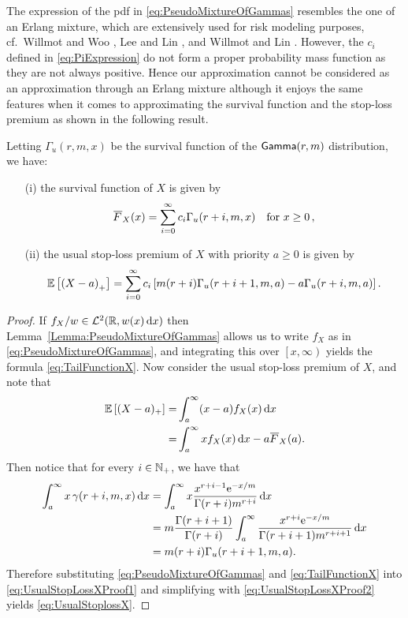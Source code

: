 The expression of the pdf in \eqref{eq:PseudoMixtureOfGammas} resembles the one of an Erlang mixture, which are extensively used for risk modeling purposes, cf.\ Willmot and Woo \cite{WiWo07}, Lee and Lin \cite{LeLi10}, and Willmot and Lin \cite{WiLi11}. However, the $c_i$ defined in \eqref{eq:PiExpression} do not form a proper probability mass function as they are not always positive. Hence our approximation cannot be considered as an approximation through an Erlang mixture although it enjoys the same features when it comes to approximating the survival function and the stop-loss premium as shown in the following result.
\begin{proposition} \label{prop:OrthogonalPolynomialForm}
Letting $\Gamma_u(r,m,x)$ be the survival function of the $\mathsf{Gamma}(r,m)$ distribution,  we have:
\begin{itemize}
\item[(i)] the survival function of $X$ is given by
\begin{equation}\label{eq:TailFunctionX}
\Ftail_{X}(x) = \sum_{i=0}^{\infty}c_i\Gamma_{u}(r+i,m,x) \quad \text{for } x \ge 0 \,,
\end{equation}
\item[(ii)] the usual stop-loss premium of $X$ with priority $a \ge 0$ is given by
\begin{equation}
\operatorname{{\mathbb E}}\left[\left(X-a\right)_{+}\right] = \sum_{i=0}^{\infty}c_i\left[m (r+i) \Gamma_{u}(r+i+1,m,a)-a\Gamma_{u}(r+i,m,a)\right]. \label{eq:UsualStoplossX}
\end{equation}
\end{itemize}
\end{proposition}
\begin{proof}
If $f_{X}/w\in \mathcal{L}^2(\mathbb{R}, w(x) \mathop{}\!\mathrm{d} x)$ then Lemma~\ref{Lemma:PseudoMixtureOfGammas} allows us to write $f_X$ as in \eqref{eq:PseudoMixtureOfGammas}, and integrating this over $\left[x,\infty\right)$ yields the formula \eqref{eq:TailFunctionX}.
Now consider the usual stop-loss premium of $X$, and note that
\begin{align}
\Exp\left[(X-a)_+\right]=&\int_{a}^{\infty}(x-a)f_{X}(x)\dd x \nonumber\\
=&\int_{a}^{\infty}xf_{X}(x)\dd x-a\Ftail_{X}(a).\label{eq:UsualStopLossXProof1}
\end{align}
Then notice that for every $i \in \mathbb{N}_+$, we have that
\begin{align}
\int_{a}^{\infty} x \, \gamma(r+i, m, x)\mathop{}\!\mathrm{d} x
&= \int_{a}^{\infty}x\frac{x^{r+i-1} \mathrm{e}^{-x/m}}{\Gamma(r+i)m^{r+i}}\mathop{}\!\mathrm{d} x\nonumber\\
&= m\frac{\Gamma(r+i+1)}{\Gamma(r+i)}\int_{a}^{\infty}\frac{x^{r+i} \mathrm{e}^{-x/m}}{\Gamma(r+i+1)m^{r+i+1}}\mathop{}\!\mathrm{d} x\nonumber\\
&= m (r+i) \Gamma_{u}(r+i+1,m,a).\label{eq:UsualStopLossXProof2}
\end{align}
Therefore substituting \eqref{eq:PseudoMixtureOfGammas} and \eqref{eq:TailFunctionX} into \eqref{eq:UsualStopLossXProof1} and simplifying with \eqref{eq:UsualStopLossXProof2} yields \eqref{eq:UsualStoplossX}.
\end{proof}

